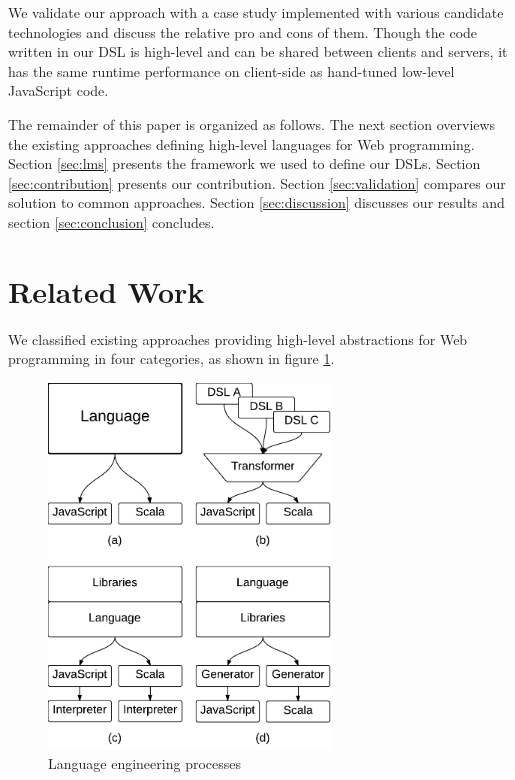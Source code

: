 \documentclass[preprint]{sigplanconf}
\begin{document}
We validate our approach with a case study implemented with various candidate technologies and
discuss the relative pro and cons of them. Though the code written in our DSL is high-level and can
be shared between clients and servers, it has the same runtime performance on client-side as
hand-tuned low-level JavaScript code.

The remainder of this paper is organized as follows. The next section overviews the
existing approaches defining high-level languages for Web programming. Section \ref{sec:lms}
presents the framework we used to define our DSLs. Section \ref{sec:contribution} presents our
contribution. Section \ref{sec:validation} compares our solution to common approaches. Section
\ref{sec:discussion} discusses our results and section \ref{sec:conclusion} concludes.

\section{Related Work}
\label{sec:related-work}



We classified existing approaches providing high-level abstractions for Web programming in four
categories, as shown in figure \ref{fig:langs}.

\begin{figure}[htb]
\begin{center}
\includegraphics[width=7.5cm]{langs.pdf}
\end{center}
\caption{Language engineering processes}
\vspace{-0.5cm}
\label{fig:langs}
\end{figure}
\end{document}
